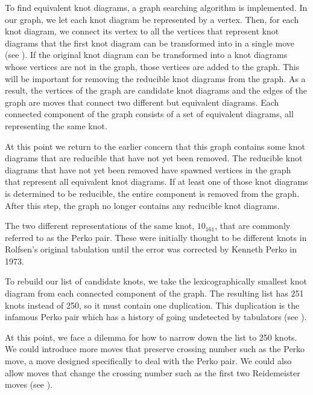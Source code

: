 \begin{paper}

To find equivalent knot diagrams, a graph searching algorithm is implemented.
In our graph, we let each knot diagram be represented by a vertex.
Then, for each knot diagram, we connect its vertex to all the vertices that
represent knot diagrams that the first knot diagram can be transformed into in a
single move (see \figMoves).
If the original knot diagram can be transformed into a knot diagrams whose
vertices are not in the graph, those vertices are added to the graph.
This will be important for removing the reducible knot diagrams from the graph.
As a result, the vertices of the graph are candidate knot diagrams and the edges
of the graph are moves that connect two different but equivalent diagrams.
Each connected component of the graph consists of a set of equivalent diagrams,
all representing the same knot.

At this point we return to the earlier concern that this graph contains some
knot diagrams that are reducible that have not yet been removed.
The reducible knot diagrams that have not yet been removed have spawned vertices
in the graph that represent all equivalent knot diagrams.
If at least one of those knot diagrams is determined to be reducible, the entire
component is removed from the graph.
After this step, the graph no longer contains any reducible knot diagrams.

{The two different representations of the same knot,
$10_{161}$, that are commonly referred to as the Perko pair.
These were initially thought to be different knots in Rolfsen's original
tabulation until the error was corrected by Kenneth Perko in 1973.}

To rebuild our list of candidate knots, we take the lexicographically smallest
knot diagram from each connected component of the graph.
The resulting list has 251 knots instead of 250, so it must contain one
duplication.
This duplication is the infamous Perko pair which has a
history of going undetected by tabulators (see \figPerko).

At this point, we face a dilemma for how to narrow down the list to 250 knots.
We could introduce more moves that preserve crossing number such as the Perko
move, a move designed specifically to deal with the Perko pair.
We could also allow moves that change the crossing number such as the first two
Reidemeister moves (see \figMoves).


\end{paper}
